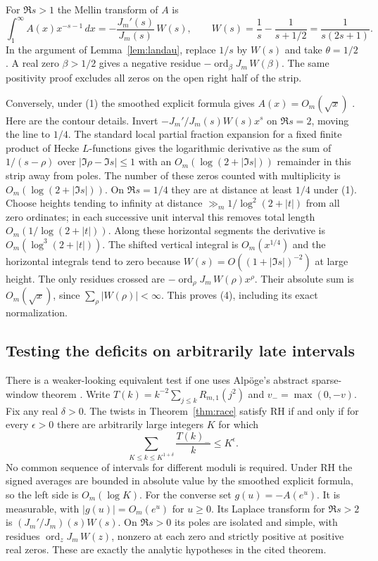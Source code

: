 \documentclass[11pt]{article}
\begin{document}
For $\Re s>1$ the Mellin transform of $A$ is
\[
 \int_1^\infty A(x)x^{-s-1}\,dx
 =-\frac{J_m'(s)}{J_m(s)}\,W(s),\qquad
 W(s)=\frac1s-\frac1{s+1/2}=\frac1{s(2s+1)} .
\]
In the argument of Lemma~\ref{lem:landau}, replace $1/s$ by $W(s)$ and take $\theta=1/2$. A real zero $\beta>1/2$ gives a negative residue $-\operatorname{ord}_\beta J_m\,W(\beta)$. The same positivity proof excludes all zeros on the open right half of the strip.

Conversely, under (1) the smoothed explicit formula gives $A(x)=O_m(\sqrt x)$ \cite[Ch.~5]{IK}. Here are the contour details. Invert $-J_m'/J_m(s)W(s)x^s$ on $\Re s=2$, moving the line to $1/4$. The standard local partial fraction expansion for a fixed finite product of Hecke $L$-functions gives the logarithmic derivative as the sum of $1/(s-\rho)$ over $|\Im\rho-\Im s|\le1$ with an $O_m(\log(2+|\Im s|))$ remainder in this strip away from poles. The number of these zeros counted with multiplicity is $O_m(\log(2+|\Im s|))$. On $\Re s=1/4$ they are at distance at least $1/4$ under (1). Choose heights tending to infinity at distance $\gg_m 1/\log^2(2+|t|)$ from all zero ordinates; in each successive unit interval this removes total length $O_m(1/\log(2+|t|))$. Along these horizontal segments the derivative is $O_m(\log^3(2+|t|))$. The shifted vertical integral is $O_m(x^{1/4})$ and the horizontal integrals tend to zero because $W(s)=O((1+|\Im s|)^{-2})$ at large height. The only residues crossed are $-\operatorname{ord}_\rho J_m\,W(\rho)x^\rho$. Their absolute sum is $O_m(\sqrt x)$, since $\sum_\rho |W(\rho)|<\infty$. This proves (4), including its exact normalization.

\subsection*{Testing the deficits on arbitrarily late intervals}
There is a weaker-looking equivalent test if one uses Alp\"oge's abstract sparse-window theorem \cite{Alp}. Write $T(k)=k^{-2}\sum_{j\le k}R_{m,1}(j^2)$ and $v_-=\max(0,-v)$. Fix any real $\delta>0$. The twists in Theorem~\ref{thm:race} satisfy RH if and only if for every $\epsilon>0$ there are arbitrarily large integers $K$ for which
\begin{equation}\label{eq:late}
 \sum_{K\le k\le K^{1+\delta}}\frac{T(k)_-}{k}\le K^\epsilon .
\end{equation}
No common sequence of intervals for different moduli is required. Under RH the signed averages are bounded in absolute value by the smoothed explicit formula, so the left side is $O_m(\log K)$. For the converse set $g(u)=-A(e^u)$. It is measurable, with $|g(u)|=O_m(e^u)$ for $u\ge0$. Its Laplace transform for $\Re s>2$ is $(J_m'/J_m)(s)W(s)$. On $\Re s>0$ its poles are isolated and simple, with residues $\operatorname{ord}_z J_m\,W(z)$, nonzero at each zero and strictly positive at positive real zeros. These are exactly the analytic hypotheses in the cited theorem.
\end{document}
